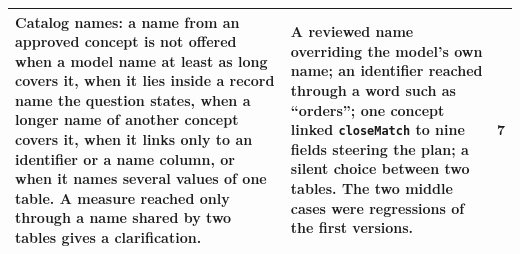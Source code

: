 \begin{table}[H]
\begin{tabular}{p{5.6cm}p{6.4cm}c}
Catalog names: a name from an approved concept is not offered when a model name at least as long covers it, when it lies inside a record name the question states, when a longer name of another concept covers it, when it links only to an identifier or a name column, or when it names several values of one table. A measure reached only through a name shared by two tables gives a clarification. & A reviewed name overriding the model's own name; an identifier reached through a word such as ``orders''; one concept linked \texttt{closeMatch} to nine fields steering the plan; a silent choice between two tables. The two middle cases were regressions of the first versions. & 7\\
\bottomrule
\end{tabular}
\end{table}
